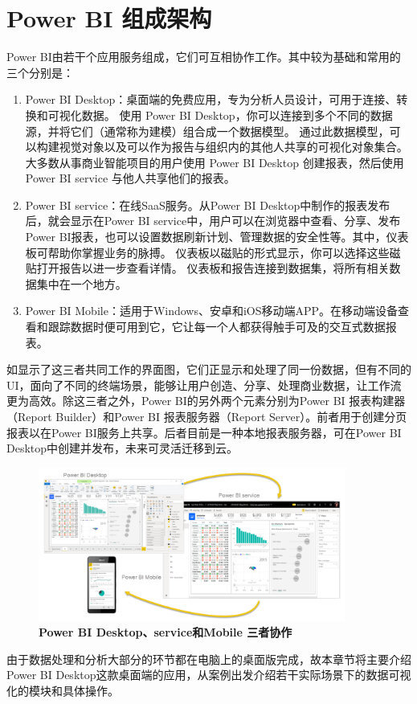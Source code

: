 \section{Power BI 组成架构}

Power BI由若干个应用服务组成，它们可互相协作工作。其中较为基础和常用的三个分别是：

\begin{enumerate}
    \item Power BI Desktop：桌面端的免费应用，专为分析人员设计，可用于连接、转换和可视化数据。 使用 Power BI Desktop，你可以连接到多个不同的数据源，并将它们（通常称为建模）组合成一个数据模型。 通过此数据模型，可以构建视觉对象以及可以作为报告与组织内的其他人共享的可视化对象集合。 大多数从事商业智能项目的用户使用 Power BI Desktop 创建报表，然后使用 Power BI service 与他人共享他们的报表。 
    \item Power BI service：在线SaaS服务。从Power BI Desktop中制作的报表发布后，就会显示在Power BI service中，用户可以在浏览器中查看、分享、发布Power BI报表，也可以设置数据刷新计划、管理数据的安全性等。其中，仪表板可帮助你掌握业务的脉搏。 仪表板以磁贴的形式显示，你可以选择这些磁贴打开报告以进一步查看详情。 仪表板和报告连接到数据集，将所有相关数据集中在一个地方。 
    \item Power BI Mobile：适用于Windows、安卓和iOS移动端APP。在移动端设备查看和跟踪数据时便可用到它，它让每一个人都获得触手可及的交互式数据报表。
\end{enumerate}

如显示了这三者共同工作的界面图，它们正显示和处理了同一份数据，但有不同的UI，面向了不同的终端场景，能够让用户创造、分享、处理商业数据，让工作流更为高效。除这三者之外，Power BI的另外两个元素分别为Power BI 报表构建器（Report Builder）和Power BI 报表服务器（Report Server）。前者用于创建分页报表以在Power BI服务上共享。后者目前是一种本地报表服务器，可在Power BI Desktop中创建并发布，未来可灵活迁移到云。

\begin{figure}[htbp]
    \centering
    \includegraphics[width=0.9\textwidth]{figure/PowerBI/powerbi_3components.png}
    \caption{\textbf{Power BI Desktop、service和Mobile 三者协作}}
    \label{fig:powerbi_3components}
\end{figure}

由于数据处理和分析大部分的环节都在电脑上的桌面版完成，故本章节将主要介绍Power BI Desktop这款桌面端的应用，从案例出发介绍若干实际场景下的数据可视化的模块和具体操作。